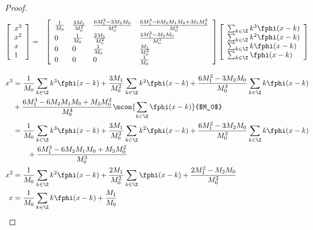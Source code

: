 \begin{proof}
\begin{eqnarray*}
  \left[\begin{array}{l}
    x^3  \\
    x^2  \\
    x    \\
    1   
  \end{array}\right]
  &=& 
  \left[\begin{array}{llll}
    \frac{1}{M_0} & \frac{3M_1}{M_0^2} & \frac{6M_1^2-3M_2M_0}{M_0^3} & \frac{6M_1^3-6M_2M_1M_0+M_3M_0^2}{M_0^4}  \\
    0 & \frac{1}{M_0}    &  \frac{2M_1}{M_0^2}                     & \frac{2M_1^2-M_2M_0}{M_0^3}                  \\
    0 & 0                &  \frac{1}{M_0}                          & \frac{M_1}{M_0^2}                            \\
    0 & 0                &  0                                    & \frac{1}{M_0}                                  
  \end{array}\right]
  \left[\begin{array}{l}
    \sum_{k\in\Z} k^3 \fphi(x-k)  \\
    \sum_{k\in\Z} k^2 \fphi(x-k)  \\
    \sum_{k\in\Z} k   \fphi(x-k)  \\
    \sum_{k\in\Z}     \fphi(x-k)  \\
  \end{array}\right]
\end{eqnarray*}


\begin{align*}
  x^3 &=  \frac{1}{M_0}                            \sum_{k\in\Z} k^3 \fphi(x-k)
       +  \frac{3M_1}{M_0^2}                       \sum_{k\in\Z} k^2 \fphi(x-k)
       +  \frac{6M_1^2-3M_2M_0}{M_0^3}             \sum_{k\in\Z} k   \fphi(x-k)
    \\& + \frac{6M_1^3-6M_2M_1M_0+M_3M_0^2}{M_0^4} 
          \mcom{\sum_{k\in\Z} \fphi(x-k)}{$M_0$}
    \\&=  \frac{1}{M_0}                            \sum_{k\in\Z} k^3 \fphi(x-k)
       +  \frac{3M_1}{M_0^2}                       \sum_{k\in\Z} k^2 \fphi(x-k)
       +  \frac{6M_1^2-3M_2M_0}{M_0^3}             \sum_{k\in\Z} k   \fphi(x-k)
    \\&\qquad+ \frac{6M_1^3-6M_2M_1M_0+M_3M_0^2}{M_0^3} 
\\
  x^2 &= 
      \frac{1}{M_0}                \sum_{k\in\Z} k^2 \fphi(x-k) 
     +\frac{2M_1}{M_0^2}           \sum_{k\in\Z}     \fphi(x-k) 
     +\frac{2M_1^2-M_2M_0}{M_0^2} 
\\
  x &=  \frac{1}{M_0}\sum_{k\in\Z} k \fphi(x-k) + \frac{M_1}{M_0}
\end{align*}

\end{proof}


